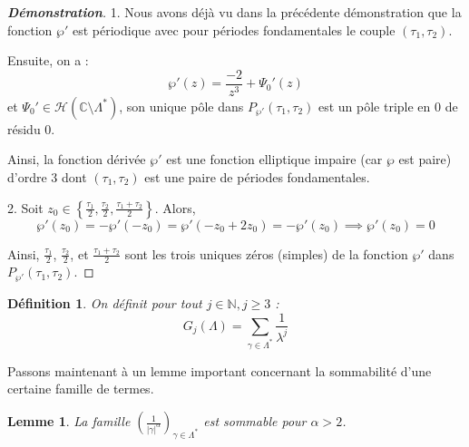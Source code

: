 \documentclass[12pt]{article}
\newtheorem{lemma}{Lemme}
\newtheorem{definition}{Définition}
\begin{document}
            \begin{proof}[\textbf{Démonstration}] 
            1. Nous avons déjà vu dans la précédente démonstration que la fonction \(\wp'\) est périodique avec pour périodes fondamentales le couple \((\tau_1, \tau_2)\).
            
            Ensuite, on a :
            \[
            \wp'(z) = \frac{-2}{z^3} + \Psi_0'(z)
            \]
            et \(\Psi_0' \in \mathcal{H}(\mathbb{C} \setminus \Lambda^*)\), son unique pôle dans \(P_{\wp'} (\tau_1, \tau_2)\) est un pôle triple en 0 de résidu 0.
            
            Ainsi, la fonction dérivée \(\wp'\) est une fonction elliptique impaire (car \(\wp\) est paire) d'ordre 3 dont \((\tau_1, \tau_2)\) est une paire de périodes fondamentales.
            
            2. Soit \(z_0 \in \left\{ \frac{\tau_1}{2}, \frac{\tau_2}{2}, \frac{\tau_1 + \tau_2}{2} \right\}\). Alors,
            \[
            \wp'(z_0) = -\wp'(-z_0) = \wp'(-z_0 + 2z_0) = -\wp'(z_0) \implies \wp'(z_0) = 0
            \]
            
            Ainsi, \(\frac{\tau_1}{2}\), \(\frac{\tau_2}{2}\), et \(\frac{\tau_1 + \tau_2}{2}\) sont les trois uniques zéros (simples) de la fonction \(\wp'\) dans \(P_{\wp'} (\tau_1, \tau_2)\).
            \end{proof}
            \begin{definition}
                On définit pour tout \(j \in \mathbb{N}, j \geq 3\) :
                \[
                G_j(\Lambda) = \sum_{\gamma \in \Lambda^*} \frac{1}{\lambda^j}
                \]
                \end{definition}
                
                Passons maintenant à un lemme important concernant la sommabilité d'une certaine famille de termes.
                
                \begin{lemma}
                La famille \(\left( \frac{1}{|\gamma|^\alpha} \right)_{\gamma \in \Lambda^*}\) est sommable pour \(\alpha > 2\).
                \end{lemma}
                
\end{document}
